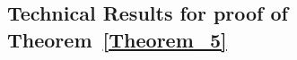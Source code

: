 \documentclass[twoside,11pt]{article}
\begin{document}




\subsection{Technical Results for proof of Theorem~\ref{Theorem_5}}






\end{document}
